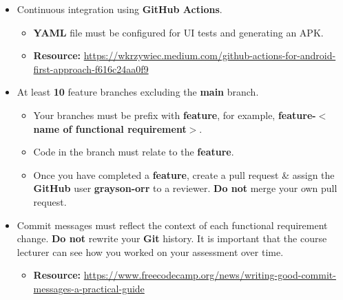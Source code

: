 \documentclass{article}
\begin{document}
			\begin{itemize}
				\item Continuous integration using \textbf{GitHub Actions}.
	      \begin{itemize}
		      \item \textbf{YAML} file must be configured for UI tests and generating an APK.
		      \item \textbf{Resource:} \footnotesize\href{https://wkrzywiec.medium.com/github-actions-for-android-first-approach-f616c24aa0f9}{https://wkrzywiec.medium.com/github-actions-for-android-first-approach-f616c24aa0f9}
	      \end{itemize}
	\item At least \textbf{10} feature branches excluding the \textbf{main} branch.
	      \begin{itemize}
		      \item Your branches must be prefix with \textbf{feature}, for example, \textbf{feature-$<$name of functional requirement$>$}.
		      \item Code in the branch must relate to the \textbf{feature}.
		      \item Once you have completed a \textbf{feature}, create a pull request \& assign the \textbf{GitHub} user \textbf{grayson-orr} to a reviewer. \textbf{Do not} merge your own pull request.
	      \end{itemize}
	\item Commit messages must reflect the context of each functional requirement change. \textbf{Do not} rewrite your \textbf{Git} history. It is important that the course lecturer can see how you worked on your assessment over time.
	      \begin{itemize}
		      \item \textbf{Resource:} \footnotesize\href{https://www.freecodecamp.org/news/writing-good-commit-messages-a-practical-guide}{https://www.freecodecamp.org/news/writing-good-commit-messages-a-practical-guide}
	      \end{itemize}
\end{itemize}
\end{document}
